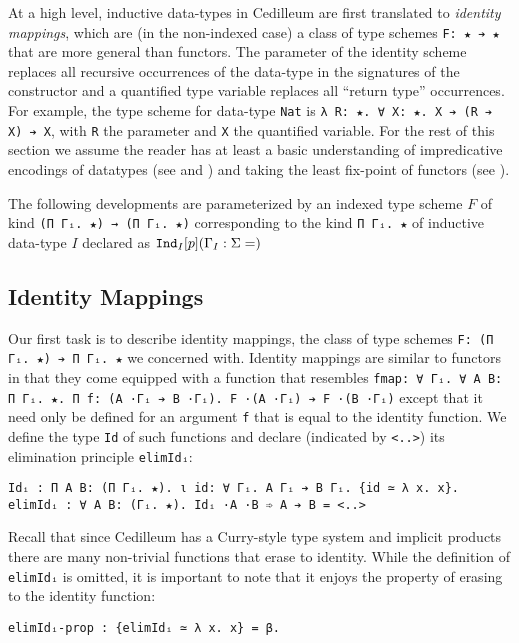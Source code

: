 \documentclass{article}
\newcommand{\indast}[5]{\texttt{Ind}_{#1} [#2] (#3 : #4 = #5)}
\begin{document}
At a high level, inductive data-types in Cedilleum are first translated to
\textit{identity mappings}, which are (in the non-indexed case) a class of type
schemes \verb;F: ★ ➔ ★; that are more general than functors. The parameter of
the identity scheme replaces all recursive occurrences of the data-type in the
signatures of the constructor and a quantified type variable replaces all
``return type'' occurrences. For example, the type scheme for data-type
\verb;Nat; is \verb;λ R: ★. ∀ X: ★. X ➔ (R ➔ X) ➔ X;, with \verb;R; the
parameter and \verb;X; the quantified variable. For the rest of this
section we assume the reader has at least a basic understanding of impredicative
encodings of datatypes (see \cite{PP89_Inductive-Types-CC} and
\cite{Wa90_Rec-Types-For-Free}) and taking the least fix-point of functors (see
\cite{MFP91_Bananas-Lenses-Envelopes-Barbed-Wire}).

The following developments are parameterized by an indexed type scheme $F$ of
kind \verb;(Π Γᵢ. ★) → (Π Γᵢ. ★); corresponding to the kind
\verb;Π Γᵢ. ★; of inductive data-type $I$ declared as $\indast{I}{p}{\Gamma_I}{\Sigma}$

\subsection{Identity Mappings}
Our first task is to describe identity mappings, the class of type schemes
\verb;F: (Π Γᵢ. ★) ➔ Π Γᵢ. ★; we concerned with. Identity mappings are similar to functors
in that they come equipped with a function that resembles
\verb;fmap: ∀ Γᵢ. ∀ A B: Π Γᵢ. ★. Π f: (A ·Γᵢ ➔ B ·Γᵢ). F ·(A ·Γᵢ) ➔ F ·(B ·Γᵢ);
except that it need only be defined for an argument \verb;f; that is equal to the
identity function. We define the type \verb;Id; of such functions and declare
(indicated by \verb;<..>;) its elimination principle \verb;elimIdᵢ;:

\begin{verbatim}
Idᵢ : Π A B: (Π Γᵢ. ★). ι id: ∀ Γᵢ. A Γᵢ ➔ B Γᵢ. {id ≃ λ x. x}.
elimIdᵢ : ∀ A B: (Γᵢ. ★). Idᵢ ·A ·B ➾ A ➔ B = <..>
\end{verbatim}

Recall that since Cedilleum has a Curry-style type system and implicit
products there are many non-trivial functions that erase to identity.
While the definition of \verb;elimIdᵢ; is omitted, it is important to note that
it enjoys the property of erasing to the identity function:
\begin{verbatim}
elimIdᵢ-prop : {elimIdᵢ ≃ λ x. x} = β.
\end{verbatim}
\end{document}

